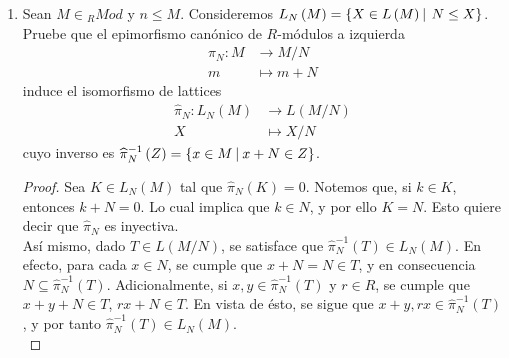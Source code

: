 \documentclass{article}
\newcommand{\lrprth}[1]{
	\left(#1\right)
}
\newcommand{\descset}[3]{
	\left\{#1\in#2\ \vline\ #3\right\}
}
\newcommand{\descapp}[6]{
	#1: #2 &\rightarrow #3\\
	#4 &\mapsto #5#6 
}
\newcommand{\gengroup}[1]{
	\left< #1\right>
}
\newcommand{\genlin}[1]{
	\mathscr{L}\lrprth{#1}
}
\theoremstyle{definition}
\theoremstyle{plain}
\theoremstyle{plain}
\theoremstyle{definition}
\theoremstyle{definition}
\theoremstyle{definition}
\theoremstyle{definition}
\theoremstyle{definition}
\theoremstyle{definition}
\begin{document}
\begin{enumerate}[label=\textbf{Ej \arabic*.}]
\begin{proof}
\begin{align*}
		\implies S&\subseteq \gengroup{\bigcup_{i\in I}X_i}_R=\sum_{i\in I}X_i\\
		&\therefore\ S=\sum_{i\in I}X_i.
	\end{align*}
	$\boxed{\text{(b)}}$ El par $(\genlin{M},\leq)$ es un CPO puesto que la relación $\subseteq$ es un orden parcial.\\
	Sea $C\leq M$ cota superior de $S$. Entonces $X_i\leq C$, $\forall\ i\in I$; luego $C\subseteq \bigcup_{i\in I}X_i$. Dado $\sum_{i\in I}X_i$ es el mínimo submódulo, con respecto a $\subseteq$, que contiene a $\bigcup_{i\in I}X_i$ se tiene que $\sum_{i\in I}X_i\leq C$ y por lo tanto $sup\lrprth{S}=\sum_{i\in I}X_i$.\\
	Sea $C\leq M$ cota inferior de $S$. Entonces $C\leq X_i$, $\forall\ i\in I$; luego $C\supseteq \bigcap_{i\in I}X_i$. y así $\bigcap_{i\in I}X_i\leq C$. Por lo tanto $inf\lrprth{S}=\bigcap_{i\in I}X_i$.\\
	\begin{equation*}
		\therefore\ \lrprth{\genlin{M},\leq}\text{ es un reticulado completo.}
	\end{equation*}
\end{proof}
\item Sean $M \in {}_{R}Mod$ y $n \leq M$. Consideremos $L_{N}\lrprth{M}=\descset{X}{L\lrprth{M}}{N \leq X}$. Pruebe que el epimorfismo canónico de $R$-módulos a izquierda
\begin{align*}
	\descapp{\pi_{N}}{M}{M/N}{m}{m+N}{ }
\end{align*}
induce el isomorfismo de lattices
\begin{align*}
	\descapp{\widehat{\pi}_{N}}{L_{N}\lrprth{M}}{L\lrprth{M/N}}{X}{X/N}{ }
\end{align*}
cuyo inverso es $\widehat{\pi}_{N}^{-1} \lrprth{Z}=\descset{x}{M}{x+N \in Z}$.
\begin{proof}
	Sea $K \in L_{N}\lrprth{M}$ tal que $\widehat{\pi}_{N} \lrprth{K}=0$. Notemos que, si $k \in K$, entonces $k+N=0$. Lo cual implica que $k \in N$, y por ello $K=N$. Esto quiere decir que $\widehat{\pi}_{N}$ es inyectiva.\\
	
	Así mismo, dado $T \in L\lrprth{M/N}$, se satisface que $\widehat{\pi}_{N}^{-1} \lrprth{T} \in L_{N} \lrprth{M}$. En efecto, para cada $x \in N$, se cumple que $x+N=N \in T$, y en consecuencia $N \subseteq \widehat{\pi}_{N}^{-1} \lrprth{T}$. Adicionalmente, si $x,y \in \widehat{\pi}_{N}^{-1}\lrprth{T}$ y $r \in R$, se cumple que $x+y+N \in T$, $rx+N \in T$. En vista de ésto, se sigue que $x+y, rx \in \widehat{\pi}_{N}^{-1} \lrprth{T}$, y por tanto $\widehat{\pi}_{N}^{-1} \lrprth{T} \in L_{N} \lrprth{M}$.\\
	

\end{proof}
\end{enumerate}
\end{document}
